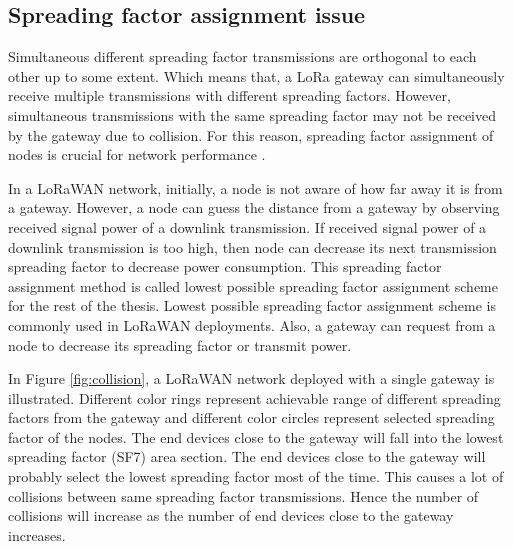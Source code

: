 \subsection{Spreading factor assignment issue}

Simultaneous different spreading factor transmissions are orthogonal to each other up to some extent. Which means that, a LoRa gateway can simultaneously receive multiple transmissions with different spreading factors. However, simultaneous transmissions with the same spreading factor may not be received by the gateway due to collision. For this reason, spreading factor assignment of nodes is crucial for network performance \cite{8030482}.

In a LoRaWAN network, initially, a node is not aware of how far away it is from a gateway. However, a node can guess the distance from a gateway by observing received signal power of a downlink transmission. If received signal power of a downlink transmission is too high, then node can decrease its next transmission spreading factor to decrease power consumption. This spreading factor assignment method is called lowest possible spreading factor assignment scheme for the rest of the thesis. Lowest possible spreading factor assignment scheme is commonly used in LoRaWAN deployments. Also, a gateway can request from a node to decrease its spreading factor or transmit power.

In Figure \ref{fig:collision}, a LoRaWAN network deployed with a single gateway is illustrated. Different color rings represent achievable range of different spreading factors from the gateway and different color circles represent selected spreading factor of the nodes. The end devices close to the gateway will fall into the lowest spreading factor (SF7) area section. The end devices close to the gateway will probably select the lowest spreading factor most of the time. This causes a lot of collisions between same spreading factor transmissions. Hence the number of collisions will increase as the number of end devices close to the gateway increases.

